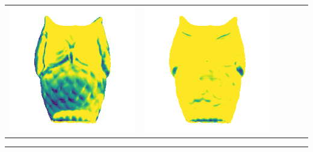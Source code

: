 \begin{center}
\begin{tabularx}{\linewidth}{@{}Y@{}Y@{}Y@{}Y@{}Y@{}Y@{}}
\includegraphics[width=\linewidth]{semisynthetic/20160617_15_marrnet_err.png} &
\includegraphics[width=\linewidth]{semisynthetic/20160617_15_ef_err.png} \\
\end{tabularx}
\begin{center}\rule{0.5\linewidth}{\linethickness}\end{center}


\end{center}
